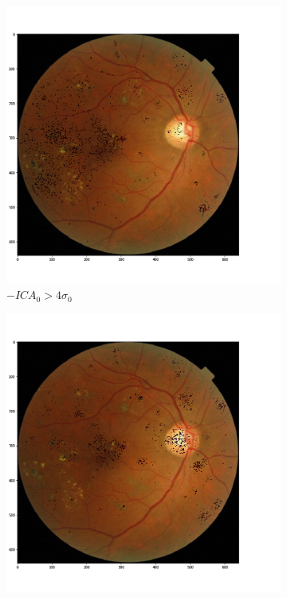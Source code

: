 \documentclass{llncs}
\begin{document}
\begin{figure}[h!]
	\centering
	\begin{subfigure}[b]{0.32\textwidth}
		\centering
		\includegraphics[width=\textwidth]{./figures/c3/retina_mICA0.png}
		\caption{$-ICA_0 > 4 \sigma_0$}	
	\end{subfigure}
	\hfill    
	\begin{subfigure}[b]{0.32\textwidth}
		\centering
		\includegraphics[width=\textwidth]{./figures/c3/retina_mICA1.png}

\end{subfigure}
\end{figure}
\end{document}
